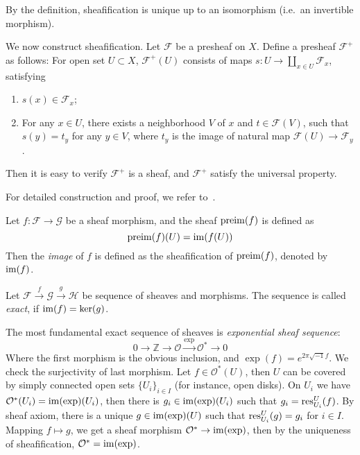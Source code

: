 By the definition, sheafification is unique up to an isomorphism (i.e.\ an invertible morphism).
\begin{cons}
    We now construct sheafification.
    Let $\mathcal{F}$ be a presheaf on $X$.
    Define a presheaf $\mathcal{F}^+$ as follows:
    For open set $U\subset X$, $\mathcal{F}^+(U)$ consists of maps $s:U\to\coprod_{x\in U}\mathcal{F}_x$,
    satisfying
    \begin{enumerate}[(1)]
        \item $s(x)\in\mathcal{F}_x$;
        \item For any $x\in U$, there exists a neighborhood $V$ of $x$ and $t\in\mathcal{F}(V)$, such that $s(y)=t_y$ for any $y\in V$, where $t_y$ is the image of natural map $\mathcal{F}(U)\to\mathcal{F}_y$. 
    \end{enumerate}
    Then it is easy to verify $\mathcal{F}^+$ is a sheaf, and $\mathcal{F}^+$ satisfy the universal property.
\end{cons}
For detailed construction and proof, we refer to~\cite[Section 6.17]{stacks-project}.

\begin{defn}
    Let $f:\mathcal{F}\to\mathcal{G}$ be a sheaf morphism, and the sheaf $\operatorname{preim}(f)$ is defined as
    \[\operatorname{preim}(f)(U)=\operatorname{im}(f(U))\]
    Then the \emph{image} of $f$ is defined as the sheafification of $\operatorname{preim}(f)$, denoted by $\operatorname{im}(f)$.
\end{defn}

\begin{defn}
    Let $\mathcal{F}\xrightarrow{f}\mathcal{G}\xrightarrow{g}\mathcal{H}$ be sequence of sheaves and morphisms.
    The sequence is called \emph{exact}, if $\operatorname{im}(f)=\ker(g)$.
\end{defn}

\begin{eg}
    The most fundamental exact sequence of sheaves is \emph{exponential sheaf sequence}:
    \[0\to\mathbb{Z}\to\mathcal{O}\xrightarrow{\exp}\mathcal{O}^*\to 0\]
    Where the first morphism is the obvious inclusion, and $\exp(f)=e^{2\pi\sqrt{-1}f}$.
    We check the surjectivity of last morphism.
    Let $f\in\mathcal{O}^*(U)$, then $U$ can be covered by simply connected open sets $\{U_i\}_{i\in I}$ (for instance, open disks).
    On $U_i$ we have $\mathcal{O}^*(U_i)=\operatorname{im}(\exp)(U_i)$, then there is $g_i\in\operatorname{im}(\exp)(U_i)$ such that $g_i=\operatorname{res}^U_{U_i}(f)$.
    By sheaf axiom, there is a unique $g\in\operatorname{im}(\exp)(U)$ such that $\operatorname{res}^U_{U_i}(g)=g_i$ for $i\in I$.
    Mapping $f\mapsto g$, we get a sheaf morphism $\mathcal{O}^*\to\operatorname{im}(\exp)$, then by the uniqueness of sheafification, $\mathcal{O}^*=\operatorname{im}(\exp)$.
\end{eg}

